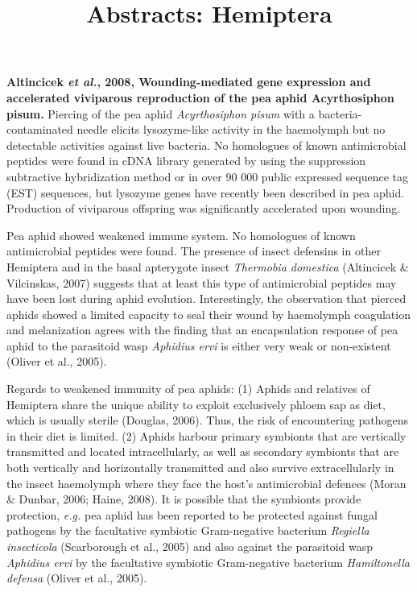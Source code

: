 \documentclass[11pt]{article}
\title{Abstracts: Hemiptera}
\author{}
\date{}
\begin{document}
\begin{sloppypar}
  \maketitle

  \linenumbers
\textbf{Altincicek \textit{et al.}, 2008, Wounding-mediated gene expression and accelerated viviparous reproduction of the pea aphid Acyrthosiphon pisum.} \newline
Piercing of the pea aphid \textit{Acyrthosiphon pisum} with a bacteria-contaminated needle elicits lysozyme-like activity in the haemolymph but no detectable activities against live bacteria. 
No homologues of known antimicrobial peptides were found in cDNA library generated by using the suppression subtractive hybridization method or in over 90 000 public expressed sequence tag (EST) sequences, but lysozyme genes have recently been described in pea aphid. 
Production of viviparous offspring was significantly accelerated upon wounding.
\par
Pea aphid showed weakened immune system. 
No homologues of known antimicrobial peptides were found. 
The presence of insect defensins in other Hemiptera and in the basal apterygote insect \textit{Thermobia domestica} (Altincicek & Vilcinskas, 2007) suggests that at least this type of antimicrobial peptides may have been lost during aphid evolution. 
Interestingly, the observation that pierced aphids showed a limited capacity to seal their wound by haemolymph coagulation and melanization agrees with the finding that an encapsulation response of pea aphid to the parasitoid wasp \textit{Aphidius ervi} is either very weak or non-existent (Oliver et al., 2005).
\par
Regards to weakened immunity of pea aphids: 
(1) Aphids and relatives of Hemiptera share the unique ability to exploit exclusively phloem sap as diet, which is usually sterile (Douglas, 2006). Thus, the risk of encountering pathogens in their diet is limited. 
(2) Aphids harbour primary symbionts that are vertically transmitted and located intracellularly, as well as secondary symbionts that are both vertically and horizontally transmitted and also survive extracellularly in the insect haemolymph where they face the host's antimicrobial defences (Moran & Dunbar, 2006; Haine, 2008). 
It is possible that the symbionts provide protection, \textit{e.g.} pea aphid has been reported to be protected against fungal pathogens by the facultative symbiotic Gram-negative bacterium \textit{Regiella insecticola} (Scarborough et al., 2005) and also against the parasitoid wasp \textit{Aphidius ervi} by the facultative symbiotic Gram-negative bacterium \textit{Hamiltonella defensa} (Oliver et al., 2005). 

\end{sloppypar}
\end{document}
